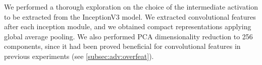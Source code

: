 We performed a thorough exploration on the choice of the intermediate activation to be extracted from the InceptionV3 model.
We extracted convolutional features after each inception module, and we obtained compact representations applying global average pooling.
We also performed PCA dimensionality reduction to 256 components, since it had been proved beneficial for convolutional features in previous experiments (see \ref{subsec:adv:overfeat}).


